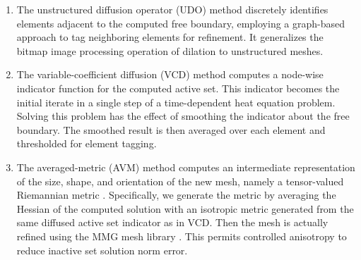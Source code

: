 \documentclass[]{interact}
\theoremstyle{plain}%
\theoremstyle{definition}
\theoremstyle{remark}
\begin{document}
\renewcommand{\labelenumi}{(\roman{enumi})}
\begin{enumerate}
\item The unstructured diffusion operator (UDO) method discretely identifies elements adjacent to the computed free boundary, employing a graph-based approach to tag neighboring elements for refinement.  It generalizes the bitmap image processing operation of dilation \cite{Serra1983} to unstructured meshes.
\item The variable-coefficient diffusion (VCD) method computes a node-wise indicator function for the computed active set.  This indicator becomes the initial iterate in a single step of a time-dependent heat equation problem.  Solving this problem has the effect of smoothing the indicator about the free boundary.  The smoothed result is then averaged over each element and thresholded for element tagging.
\item The averaged-metric (AVM) method computes an intermediate representation of the size, shape, and orientation of the new mesh, namely a tensor-valued Riemannian metric \cite{Alauzet2010}.  Specifically, we generate the metric by averaging the Hessian of the computed solution with an isotropic metric generated from the same diffused active set indicator as in VCD.  Then the mesh is actually refined using the MMG mesh library \cite{DapognyDobrzynskiFrey2014}.  This permits controlled anisotropy \cite{Wallworketal2020} to reduce inactive set solution norm error.
\end{enumerate}

\end{document}
